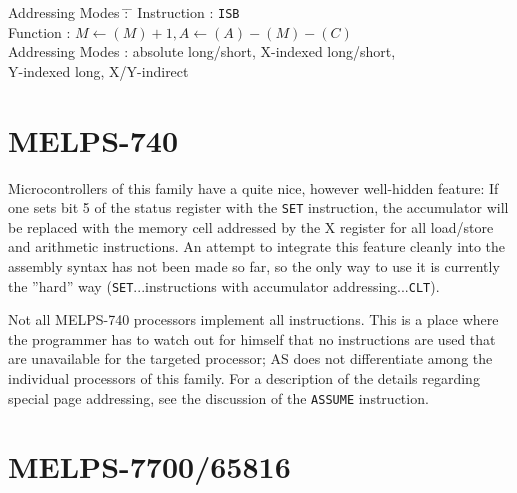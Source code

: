 \documentclass[12pt,twoside]{report}
\newcommand{\tty}[1]{{\tt #1}}
\newcommand{\asname}{{AS}}
\begin{document}
\begin{tabbing}
Addressing Modes \= : \= \kill
Instruction      \> : \> \tty{ISB} \\
Function         \> : \> $M\leftarrow(M)+1, A\leftarrow(A)-(M)-(C)$ \\
Addressing Modes \> : \> absolute long/short, X-indexed long/short, \\
                 \>   \> Y-indexed long, X/Y-indirect \\
\end{tabbing}


\section{MELPS-740}

Microcontrollers of this family have a quite nice, however well-hidden
feature: If one sets bit 5 of the status register with the \tty{SET}
instruction, the accumulator will be replaced with the memory cell
addressed by the X register for all load/store and arithmetic
instructions.  An attempt to integrate this feature cleanly into the
assembly syntax has not been made so far, so the only way to use it
is currently the ''hard'' way (\tty{SET}...instructions with accumulator
addressing...\tty{CLT}).

Not all MELPS-740 processors implement all instructions.  This is a
place where the programmer has to watch out for himself that no
instructions are used that are unavailable for the targeted
processor; \asname{} does not differentiate among the individual processors
of this family.  For a description of the details regarding special
page addressing, see the discussion of the \tty{ASSUME} instruction.


\section{MELPS-7700/65816}
\label{MELPS7700Spec}
\end{document}
